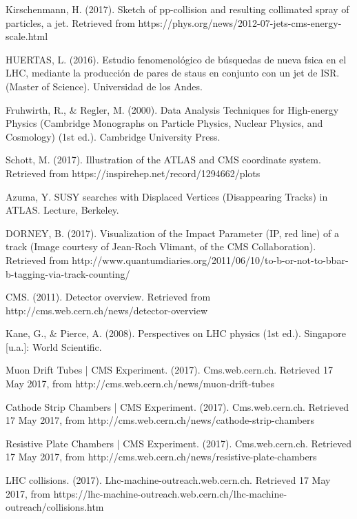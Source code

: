 \documentclass[11pt, oneside]{book}
\begin{document}
\begin{thebibliography}{10}
 Kirschenmann, H. (2017). Sketch of pp-collision and resulting collimated spray of particles, a jet. Retrieved from https://phys.org/news/2012-07-jets-cms-energy-scale.html

 HUERTAS, L. (2016). Estudio fenomenológico de búsquedas de nueva fsica en el LHC, mediante la producción de pares de staus en conjunto con un jet de ISR. (Master of Science). Universidad de los Andes.

 Fruhwirth, R., \& Regler, M. (2000). Data Analysis Techniques for High-energy Physics (Cambridge Monographs on Particle Physics, Nuclear Physics, and Cosmology) (1st ed.). Cambridge University Press.

 Schott, M. (2017). Illustration of the ATLAS and CMS coordinate system. Retrieved from https://inspirehep.net/record/1294662/plots

  Azuma, Y. SUSY searches with Displaced Vertices (Disappearing Tracks) in ATLAS. Lecture, Berkeley.

 DORNEY, B. (2017). Visualization of the Impact Parameter (IP, red line) of a track (Image courtesy of Jean-Roch Vlimant, of the CMS Collaboration). Retrieved from http://www.quantumdiaries.org/2011/06/10/to-b-or-not-to-bbar-b-tagging-via-track-counting/

 CMS. (2011). Detector overview. Retrieved from http://cms.web.cern.ch/news/detector-overview

 Kane, G., \& Pierce, A. (2008). Perspectives on LHC physics (1st ed.). Singapore [u.a.]: World Scientific.

 Muon Drift Tubes | CMS Experiment. (2017). Cms.web.cern.ch. Retrieved 17 May 2017, from http://cms.web.cern.ch/news/muon-drift-tubes

 Cathode Strip Chambers | CMS Experiment. (2017). Cms.web.cern.ch. Retrieved 17 May 2017, from http://cms.web.cern.ch/news/cathode-strip-chambers

 Resistive Plate Chambers | CMS Experiment. (2017). Cms.web.cern.ch. Retrieved 17 May 2017, from http://cms.web.cern.ch/news/resistive-plate-chambers

 LHC collisions. (2017). Lhc-machine-outreach.web.cern.ch. Retrieved 17 May 2017, from https://lhc-machine-outreach.web.cern.ch/lhc-machine-outreach/collisions.htm


\end{thebibliography}
\end{document}
